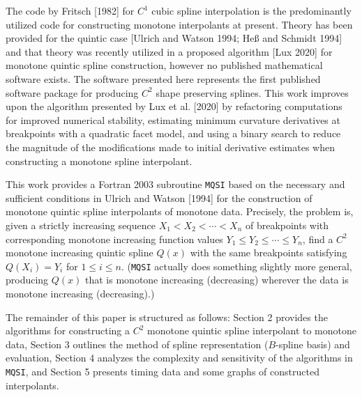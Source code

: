 The code by Fritsch [1982] for $C^1$ cubic spline interpolation is the
predominantly utilized code for constructing monotone interpolants at
present. Theory has been provided for the quintic case [Ulrich and
Watson 1994; He{\ss} and Schmidt 1994] and that theory was recently
utilized in a proposed algorithm [Lux 2020] for monotone quintic
spline construction, however no published mathematical software
exists. The software presented here represents the first published
software package for producing $C^2$ shape preserving splines. This
work improves upon the algorithm presented by Lux et al. [2020] by
refactoring computations for improved numerical stability, estimating
minimum curvature derivatives at breakpoints with a quadratic facet
model, and using a binary search to reduce the magnitude of the
modifications made to initial derivative estimates when constructing a
monotone spline interpolant.

This work provides a Fortran 2003 subroutine {\tt MQSI} based on the
necessary and sufficient conditions in Ulrich and Watson [1994] for the
construction of monotone quintic spline interpolants of monotone data.
Precisely, the problem is, given a strictly increasing sequence $X_1<X_2<
\cdots <X_n$ of breakpoints with corresponding monotone increasing
function values $Y_1\le Y_2\le \cdots \le Y_n$, find a $C^2$ monotone
increasing quintic spline $Q(x)$ with the same breakpoints satisfying
$Q(X_i)=Y_i$ for $1\le i\le n$. ({\tt MQSI} actually does something slightly
more general, producing $Q(x)$ that is monotone increasing (decreasing)
wherever the data is monotone increasing (decreasing).)

The remainder of this paper is structured as follows: Section 2 provides
the algorithms for constructing a $C^2$ monotone quintic spline interpolant
to monotone data, Section 3 outlines the method of spline representation
($B$-spline basis) and evaluation, Section 4 analyzes the complexity and
sensitivity of the algorithms in {\tt MQSI}, and Section 5 presents 
timing data and some graphs of constructed interpolants.

